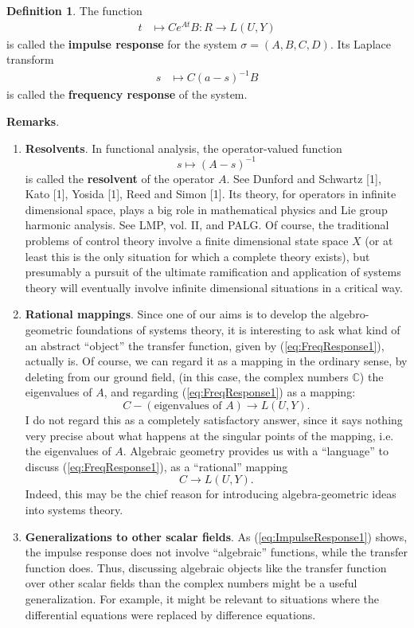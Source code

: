 \documentclass[12pt]{book}
\theoremstyle{plain}
\theoremstyle{definition}
\newtheorem{definition}{Definition}[section]
\begin{document}
\begin{definition}
    The function
    \begin{align} \label{eq:ImpulseResponse1}
        t &\mapsto Ce^{At}B: R \to L(U, Y)
    \end{align}
    is called the \textbf{impulse response} for the system $\sigma = (A, B, C, D)$.
    Its Laplace transform
    \begin{align} \label{eq:FreqResponse1}
        s &\mapsto C(a-s)^{-1}B
    \end{align}
    is called the \textbf{frequency response} of the system.
\end{definition}

\textbf{Remarks}. %
\begin{enumerate}
    \item \textbf{Resolvents}.
    In functional analysis, the operator-valued function
    $$s \mapsto (A-s)^{-1}$$
    is called the \textbf{resolvent} of the operator $A$.
    See Dunford and Schwartz [1], Kato [1], Yosida [1], Reed and Simon [1]. %
    Its theory, for operators in infinite dimensional space, plays a big role in mathematical physics and Lie group harmonic analysis.
    See LMP, vol. II, and PALG.
    Of course, the traditional problems of control theory involve a finite dimensional state space $X$ (or at least this is the only situation for which a complete theory exists), but presumably a pursuit of the ultimate ramification and application of systems theory will eventually involve infinite dimensional situations in a critical way.
    \item \textbf{Rational mappings}.
    Since one of our aims is to develop the algebro-geometric foundations of systems theory, it is interesting to ask what kind of an abstract ``object'' the transfer function, given by (\ref{eq:FreqResponse1}), actually is.
    Of course, we can regard it as a mapping in the ordinary sense, by deleting from our ground field, (in this case, the complex numbers $\mathbb{C}$) the eigenvalues of $A$, and regarding (\ref{eq:FreqResponse1}) as a mapping:
    $$C - (\text{eigenvalues of } A) \to L(U, Y).$$
    I do not regard this as a completely satisfactory answer, since it says nothing very precise about what happens at the singular points of the mapping, i.e. the eigenvalues of $A$.
    Algebraic geometry provides us with a ``language'' to discuss (\ref{eq:FreqResponse1}), as a ``rational'' mapping
    $$C \to L(U, Y).$$
    Indeed, this may be the chief reason for introducing algebra-geometric ideas into systems theory.
    \item \textbf{Generalizations to other scalar fields}.
    As (\ref{eq:ImpulseResponse1}) shows, the impulse response does not involve ``algebraic'' functions, while the transfer function does.
    Thus, discussing algebraic objects like the transfer function over other scalar fields than the complex numbers might be a useful generalization.
    For example, it might be relevant to situations where the differential equations were replaced by difference equations.
\end{enumerate}
\end{document}
